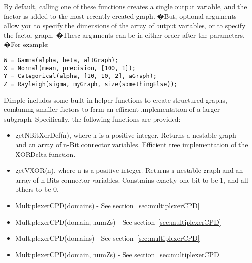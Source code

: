 By default, calling one of these functions creates a single output variable, and the factor is added to the most-recently created graph. �But, optional arguments allow you to specify the dimensions of the array of output variables, or to specify the factor graph. �These arguments can be in either order after the parameters. �For example:

\begin{lstlisting}
W = Gamma(alpha, beta, altGraph);
X = Normal(mean, precision, [100, 1]);
Y = Categorical(alpha, [10, 10, 2], aGraph);
Z = Rayleigh(sigma, myGraph, size(somethingElse));
\end{lstlisting}

\fi


Dimple includes some built-in helper functions to create structured graphs, combining smaller factors to form an efficient implementation of a larger subgraph.  Specifically, the following functions are provided:

\ifmatlab
\begin{itemize}
\item getNBitXorDef(n), where n is a positive integer. Returns a nestable graph and an array of n-Bit connector variables. Efficient tree implementation of the XORDelta function.
\item getVXOR(n), where n is a positive integer. Returns a nestable graph and an array of n-Bits connector variables. Constrains exactly one bit to be 1, and all others to be 0.
\item MultiplexerCPD(domains) - See section~\ref{sec:multiplexerCPD}
\item MultiplexerCPD(domain, numZs) - See section~\ref{sec:multiplexerCPD}
\end{itemize}
\fi

\ifjava
\begin{itemize}
\item MultiplexerCPD(domains) - See section~\ref{sec:multiplexerCPD}
\item MultiplexerCPD(domain, numZs) - See section~\ref{sec:multiplexerCPD}
\end{itemize}
\fi

